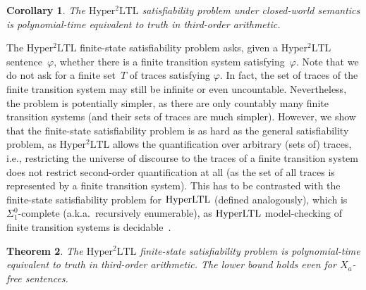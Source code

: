 \documentclass[dvipsnames,10pt,a4paper]{amsart}
\newtheorem{thm}{Theorem}[section]
\newtheorem{cor}[thm]{Corollary}
\theoremstyle{definition}
\theoremstyle{remark}
\renewcommand{\phi}{\varphi}
\newcommand{\hyltl}{\mathrm{Hyper\-LTL}\xspace}
\newcommand{\sohyltl}{\mathrm{Hyper^2LTL}\xspace}
\newcommand{\univar}{X_a}
\begin{document}
\begin{cor}
\label{cor_satcomplexity_cw}
The $\sohyltl$ satisfiability problem under closed-world semantics is polynomial-time equivalent to truth in third-order arithmetic.
\end{cor}

The $\sohyltl$ finite-state satisfiability problem asks, given a $\sohyltl$ sentence~$\phi$, whether there is a finite transition system satisfying~$\phi$.
Note that we do not ask for a finite set~$T$ of traces satisfying $\phi$. In fact, the set of traces of the finite transition system may still be infinite or even uncountable. 
Nevertheless, the problem is potentially simpler, as there are only countably many finite transition systems (and their sets of traces are much simpler).
However, we show that the finite-state satisfiability problem is as hard as the general satisfiability problem, as $\sohyltl$ allows the quantification over arbitrary (sets of) traces, i.e., restricting the universe of discourse to the traces of a finite transition system does not restrict second-order quantification at all (as the set of all traces is represented by a finite transition system).
This has to be contrasted with the finite-state satisfiability problem for $\hyltl$ (defined analogously), which is $\Sigma_1^0$-complete (a.k.a.\ recursively enumerable), as $\hyltl$ model-checking of finite transition systems is decidable~\cite{ClarksonFKMRS14}.


\begin{thm}
\label{thm_finsatcomplexity}
The $\sohyltl$ finite-state satisfiability problem is polynomial-time equivalent to truth in third-order arithmetic. The lower bound holds even for $\univar$-free sentences.
\end{thm}
\end{document}
